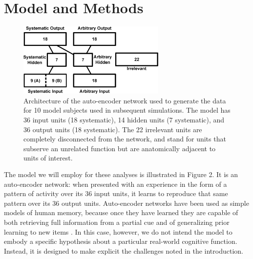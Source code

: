 \section{Model and Methods}


\begin{figure}[b]
\centering
\includegraphics[width=0.65\textwidth]{figures/figure2.eps}
\caption{\label{fig.model_outline} Architecture of the auto-encoder network used to generate the data for 10 model subjects used in subsequent simulations. The model has 36 input units (18 systematic), 14 hidden units (7 systematic), and 36 output units (18 systematic). The 22 irrelevant units are completely disconnected from the network, and stand for units that subserve an unrelated function but are anatomically adjacent to units of interest.}
\end{figure}

The model we will employ for these analyses is illustrated in Figure 2. It is an auto-encoder network: when presented with an experience in the form of a pattern of activity over its 36 input units, it learns to reproduce that same pattern over its 36 output units. Auto-encoder networks have been used as simple models of human memory, because once they have learned they are capable of both retrieving full information from a partial cue and of generalizing prior learning to new items \cite{McClellandRumelhart85}. In this case, however, we do not intend the model to embody a specific hypothesis about a particular real-world cognitive function. Instead, it is designed to make explicit the challenges noted in the introduction. 

